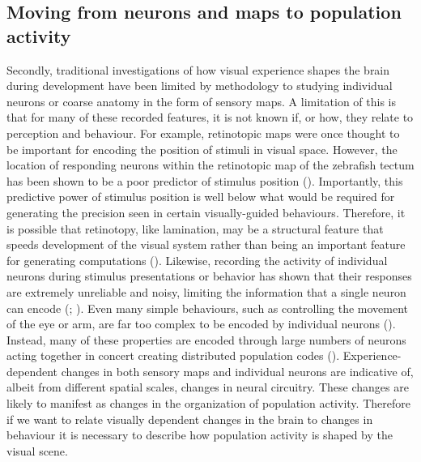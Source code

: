 \subsection{Moving from neurons and maps to population activity}

Secondly, traditional investigations of how visual experience shapes the brain during development have been limited by methodology to studying individual neurons or coarse anatomy in the form of sensory maps. A limitation of this is that for many of these recorded features, it is not known if, or how, they relate to perception and behaviour. For example, retinotopic maps were once thought to be important for encoding the position of stimuli in visual space. However, the location of responding neurons within the retinotopic map of the zebrafish tectum has been shown to be a poor predictor of stimulus position (\cite{Avitan2016}). Importantly, this predictive power of stimulus position is well below what would be required for generating the precision seen in certain visually-guided behaviours. Therefore, it is possible that retinotopy, like lamination, may be a structural feature that speeds development of the visual system rather than being an important feature for generating computations (\cite{Nikolaou2015LaminationCircuits}). Likewise, recording the activity of individual neurons during stimulus presentations or behavior has shown that their responses are extremely unreliable and noisy, limiting the information that a single neuron can encode (\cite{Avitan2016}; \cite{Graf2011DecodingCortex}). Even many simple behaviours, such as controlling the movement of the eye or arm, are far too complex  to be encoded by individual neurons (\cite{Lee1988PopulationColliculus, Lee1988PopulationColliculus,Georgopoulos1995, Averbeck2006NeuralComputation}). Instead, many of these properties are encoded through large numbers of neurons acting together in concert creating distributed population codes (\cite{Yuste2015, Saxena2019TowardsDoctrine, Buzsaki2010}). Experience-dependent changes in both sensory maps and individual neurons are indicative of, albeit from different spatial scales, changes in neural circuitry. These changes are likely to manifest as changes in the organization of population activity. Therefore if we want to relate visually dependent changes in the brain to changes in behaviour it is necessary to describe how population activity is shaped by the visual scene.


